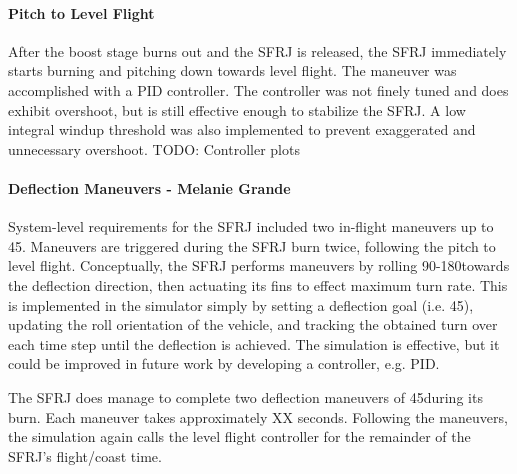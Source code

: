 \paragraph{Pitch to Level Flight} After the boost stage burns out and the SFRJ is released, the SFRJ immediately starts burning and pitching down towards level flight. The maneuver was accomplished with a PID controller. The controller was not finely tuned and does exhibit overshoot, but is still effective enough to stabilize the SFRJ. A low integral windup threshold was also implemented to prevent exaggerated and unnecessary overshoot. \color{red}TODO: Controller plots\color{black}

\paragraph{Deflection Maneuvers - Melanie Grande} System-level requirements for the SFRJ included two in-flight maneuvers up to 45\textdegree. Maneuvers are triggered during the SFRJ burn twice, following the pitch to level flight. Conceptually, the SFRJ performs maneuvers by rolling 90-180\textdegree towards the deflection direction, then actuating its fins to effect maximum turn rate. This is implemented in the simulator simply by setting a deflection goal (i.e. 45\textdegree), updating the roll orientation of the vehicle, and tracking the obtained turn over each time step until the deflection is achieved. The simulation is effective, but it could be improved in future work by developing a controller, e.g. PID. 

The SFRJ does manage to complete two deflection maneuvers of 45\textdegree during its burn. Each maneuver takes approximately \color{red}XX seconds\color{black}. Following the maneuvers, the simulation again calls the level flight controller for the remainder of the SFRJ's flight/coast time. 